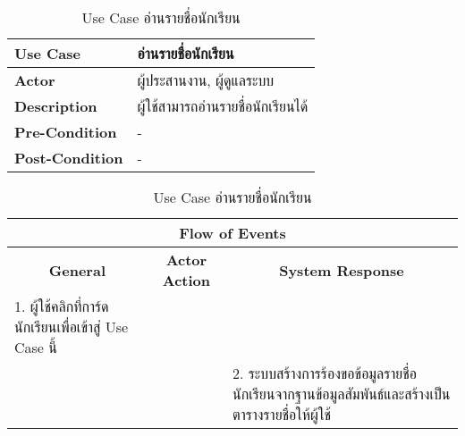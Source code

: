 \begin{table}[H]
    \caption{Use Case อ่านรายชื่อนักเรียน}
    \label{tab:use-case-read-student}
    \begin{tabularx}{\textwidth}{ | p{3cm} | X | }
    \hline
    \textbf{Use Case} & อ่านรายชื่อนักเรียน \\
    \hline
    \textbf{Actor} & ผู้ประสานงาน, ผู้ดูแลระบบ \\
    \hline
    \textbf{Description} & ผู้ใช้สามารถอ่านรายชื่อนักเรียนได้ \\
    \hline
    \textbf{Pre-Condition} & - \\
    \hline
    \textbf{Post-Condition} & - \\
    \hline
    \end{tabularx}
    \begin{tabularx}{\textwidth}{ | X | X | X | }
    \multicolumn{3}{|c|}{\textbf{Flow of Events}} \\
    \hline
    \multicolumn{1}{|c|}{\textbf{General}} & \multicolumn{1}{|c|}{\textbf{Actor Action}} & \multicolumn{1}{|c|}{\textbf{System Response}} \\
    \hline
    1. ผู้ใช้คลิกที่การ์ดนักเรียนเพื่อเข้าสู่ Use Case นี้ &  &  \\
    \hline
    & & 2. ระบบสร้างการร้องขอข้อมูลรายชื่อนักเรียนจากฐานข้อมูลสัมพันธ์และสร้างเป็นตารางรายชื่อให้ผู้ใช้ \\
    \hline
    \end{tabularx}
\end{table}
